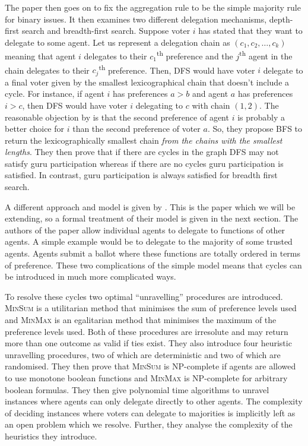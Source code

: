 \documentclass[11pt,a4paper, titlepage]{article}
\theoremstyle{definition}
\begin{document}
The paper then goes on to fix the aggregation rule to be the simple majority rule for binary issues. It then examines two different delegation mechanisms, depth-first search and breadth-first search.
Suppose voter $i$ has stated that they want to delegate to some agent. Let us represent a delegation chain as $(c_1, c_2, \ldots, c_k)$ meaning that agent $i$ delegates to their $c_1$\textsuperscript{th} preference and the $j$\textsuperscript{th} agent in the chain delegates to their $c_j$\textsuperscript{th} preference.
Then, DFS would have voter $i$ delegate to a final voter given by the smallest lexicographical chain that doesn't include a cycle. For instance, if agent $i$ has preferences $a > b$ and agent $a$ has preferences $i > c$, then DFS would have voter $i$ delegating to $c$ with chain $(1, 2)$.
The reasonable objection by \citeauthor{kotsialou} is that the second preference of agent $i$ is probably a better choice for $i$ than the second preference of voter $a$.
So, they propose BFS to return the lexicographically smallest chain \emph{from the chains with the smallest lengths}.
They then prove that if there are cycles in the graph DFS may not satisfy guru participation whereas if there are no cycles guru participation is satisfied. In contrast, guru participation is always satisfied for breadth first search.

A different approach and model is given by \citet{grandi}. This is the paper which we will be extending, so a formal treatment of their model is given in the next section.
The authors of the paper allow individual agents to delegate to functions of other agents. A simple example would be to delegate to the majority of some trusted agents.
Agents submit a ballot where these functions are totally ordered in terms of preference.
These two complications of the simple model means that cycles can be introduced in much more complicated ways.

To resolve these cycles two optimal ``unravelling'' procedures are introduced. \textsc{MinSum} is a utilitarian method that minimises the sum of preference levels used and \textsc{MinMax} is an egalitarian method that minimises the maximum of the preference levels used.
Both of these procedures are irresolute and may return more than one outcome as valid if ties exist.
They also introduce four heuristic unravelling procedures, two of which are deterministic and two of which are randomised.
They then prove that \textsc{MinSum} is NP-complete if agents are allowed to use monotone boolean functions  and \textsc{MinMax} is NP-complete for arbitrary boolean formulas.
They then give polynomial time algorithms to unravel instances where agents can only delegate directly to other agents.
The complexity of deciding instances where voters can delegate to majorities is implicitly left as an open problem which we resolve.
Further, they analyse the complexity of the heuristics they introduce.
\end{document}
